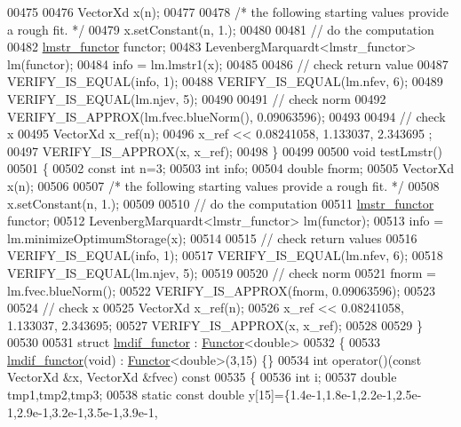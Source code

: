 \begin{DoxyCode}
00475 
00476   VectorXd x(n);
00477 
00478   \textcolor{comment}{/* the following starting values provide a rough fit. */}
00479   x.setConstant(n, 1.);
00480 
00481   \textcolor{comment}{// do the computation}
00482   \hyperlink{structlmstr__functor}{lmstr\_functor} functor;
00483   LevenbergMarquardt<lmstr\_functor> lm(functor);
00484   info = lm.lmstr1(x);
00485 
00486   \textcolor{comment}{// check return value}
00487   VERIFY\_IS\_EQUAL(info, 1);
00488   VERIFY\_IS\_EQUAL(lm.nfev, 6);
00489   VERIFY\_IS\_EQUAL(lm.njev, 5);
00490 
00491   \textcolor{comment}{// check norm}
00492   VERIFY\_IS\_APPROX(lm.fvec.blueNorm(), 0.09063596);
00493 
00494   \textcolor{comment}{// check x}
00495   VectorXd x\_ref(n);
00496   x\_ref << 0.08241058, 1.133037, 2.343695 ;
00497   VERIFY\_IS\_APPROX(x, x\_ref);
00498 \}
00499 
00500 \textcolor{keywordtype}{void} testLmstr()
00501 \{
00502   \textcolor{keyword}{const} \textcolor{keywordtype}{int} n=3;
00503   \textcolor{keywordtype}{int} info;
00504   \textcolor{keywordtype}{double} fnorm;
00505   VectorXd x(n);
00506 
00507   \textcolor{comment}{/* the following starting values provide a rough fit. */}
00508   x.setConstant(n, 1.);
00509 
00510   \textcolor{comment}{// do the computation}
00511   \hyperlink{structlmstr__functor}{lmstr\_functor} functor;
00512   LevenbergMarquardt<lmstr\_functor> lm(functor);
00513   info = lm.minimizeOptimumStorage(x);
00514 
00515   \textcolor{comment}{// check return values}
00516   VERIFY\_IS\_EQUAL(info, 1);
00517   VERIFY\_IS\_EQUAL(lm.nfev, 6);
00518   VERIFY\_IS\_EQUAL(lm.njev, 5);
00519 
00520   \textcolor{comment}{// check norm}
00521   fnorm = lm.fvec.blueNorm();
00522   VERIFY\_IS\_APPROX(fnorm, 0.09063596);
00523 
00524   \textcolor{comment}{// check x}
00525   VectorXd x\_ref(n);
00526   x\_ref << 0.08241058, 1.133037, 2.343695;
00527   VERIFY\_IS\_APPROX(x, x\_ref);
00528 
00529 \}
00530 
00531 \textcolor{keyword}{struct }\hyperlink{structlmdif__functor}{lmdif\_functor} : \hyperlink{struct_functor}{Functor}<double>
00532 \{
00533     \hyperlink{structlmdif__functor}{lmdif\_functor}(\textcolor{keywordtype}{void}) : \hyperlink{struct_functor}{Functor}<double>(3,15) \{\}
00534     \textcolor{keywordtype}{int} operator()(\textcolor{keyword}{const} VectorXd &x, VectorXd &fvec)\textcolor{keyword}{ const}
00535 \textcolor{keyword}{    }\{
00536         \textcolor{keywordtype}{int} i;
00537         \textcolor{keywordtype}{double} tmp1,tmp2,tmp3;
00538         \textcolor{keyword}{static} \textcolor{keyword}{const} \textcolor{keywordtype}{double} y[15]=\{1.4e-1,1.8e-1,2.2e-1,2.5e-1,2.9e-1,3.2e-1,3.5e-1,3.9e-1,

\end{DoxyCode}
